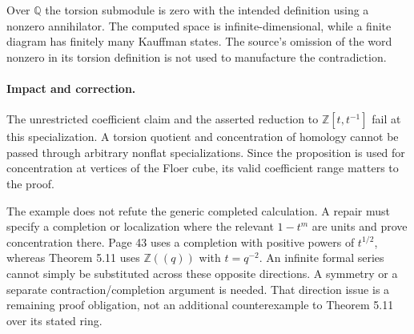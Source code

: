 \documentclass[10pt]{article}
\begin{document}
Over \(\mathbb Q\) the torsion submodule is zero with the intended definition using a nonzero annihilator. The computed space is infinite-dimensional, while a finite diagram has finitely many Kauffman states. The source’s omission of the word nonzero in its torsion definition is not used to manufacture the contradiction.\par
\paragraph*{Impact and correction.}\mbox{}\par
The unrestricted coefficient claim and the asserted reduction to \(\mathbb Z[t,t^{-1}]\) fail at this specialization. A torsion quotient and concentration of homology cannot be passed through arbitrary nonflat specializations. Since the proposition is used for concentration at vertices of the Floer cube, its valid coefficient range matters to the proof.\par
The example does not refute the generic completed calculation. A repair must specify a completion or localization where the relevant \(1-t^m\) are units and prove concentration there. Page 43 uses a completion with positive powers of \(t^{1/2}\), whereas Theorem 5.11 uses \(\mathbb Z((q))\) with \(t=q^{-2}\). An infinite formal series cannot simply be substituted across these opposite directions. A symmetry or a separate contraction/completion argument is needed. That direction issue is a remaining proof obligation, not an additional counterexample to Theorem 5.11 over its stated ring.\par
\end{document}
